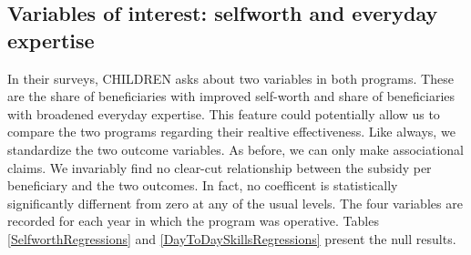 \documentclass[12pt, a4paper, titlepage]{article}\usepackage[]{graphicx}\usepackage[]{color}
\begin{document}
\subsection{Variables of interest: selfworth and everyday expertise} 

In their surveys, CHILDREN asks about two variables in both programs. These are the share of beneficiaries with improved self-worth and share of beneficiaries with broadened everyday expertise. This feature could potentially allow us to compare the two programs regarding their realtive effectiveness. Like always, we standardize the two outcome variables. As before, we can only make associational claims. We invariably find no clear-cut relationship between the subsidy per beneficiary and the two outcomes. In fact, no coefficent is statistically significantly differnent from zero at any of the usual levels. 
The four variables are recorded for each year in which the program was operative.
Tables \ref{SelfworthRegressions} and \ref{DayToDaySkillsRegressions} present the null results. 


\usepackage{graphicx}
\end{document}
